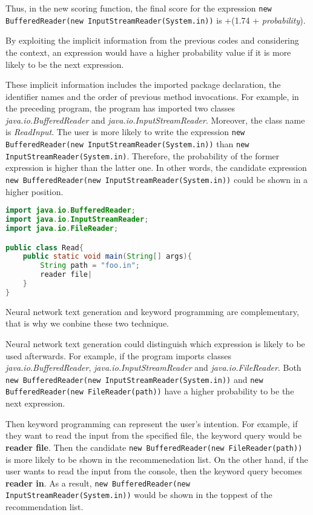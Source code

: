 \documentclass[PRO,english]{ipsj}
\begin{document}
Thus, in the new scoring function, the final score for the expression \texttt{new BufferedReader(new InputStreamReader(System.in))} is +(1.74 + \textit{probability}).

By exploiting the implicit information from the previous codes and considering the context, an expression would have a higher probability value if it is more likely to be the next expression. 

These implicit information includes the imported package declaration, the identifier names and the order of previous method invocations. For example, in the preceding program, the program has imported two classes \textit{java.io.BufferedReader} and \textit{java.io.InputStreamReader}. Moreover, the class name is \textit{ReadInput}. The user is more likely to write the expression \texttt{new BufferedReader(new InputStreamReader(System.in))} than \texttt{new InputStreamReader(System.in)}. Therefore, the probability of the former expression is higher than the latter one. In other words, the candidate expression \texttt{new BufferedReader(new InputStreamReader(System.in))} could be shown in a higher position.

\begin{lstlisting}[language=Java]
import java.io.BufferedReader;
import java.io.InputStreamReader;
import java.io.FileReader;

public class Read{
    public static void main(String[] args){
        String path = "foo.in";
        reader file|
    }
}
\end{lstlisting}
 
 Neural network text generation and keyword programming are complementary, that is why we conbine these two technique. 

 Neural network text generation could distinguish which expression is likely to be used afterwards. For example, if the program imports classes \textit{java.io.BufferedReader}, \textit{java.io.InputStreamReader} and \textit{java.io.FileReader}. Both \texttt{new BufferedReader(new InputStreamReader(System.in))} and \texttt{new BufferedReader(new FileReader(path))} have a higher probability to be the next expression.

 Then keyword programming can represent the user's intention. For example, if they want to read the input from the specified file, the keyword query would be \textbf{reader file}. Then the candidate \texttt{new BufferedReader(new FileReader(path))} is more likely to be shown in the recommenedation list. On the other hand, if the user wants to read the input from the console, then the keyword query becomes \textbf{reader in}. As a result, \texttt{new BufferedReader(new InputStreamReader(System.in))} would be shown in the toppest of the recommendation list.
\end{document}
